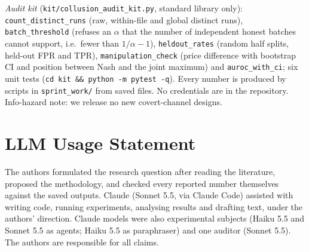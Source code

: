 \documentclass[10pt]{article}
\begin{document}
\emph{Audit kit} (\texttt{kit/collusion\_audit\_kit.py}, standard library only): \texttt{count\_distinct\_runs} (raw, within-file and global distinct runs), \texttt{batch\_threshold} (refuses an $\alpha$ that the number of independent honest batches cannot support, i.e.\ fewer than $1/\alpha-1$), \texttt{heldout\_rates} (random half splits, held-out FPR and TPR), \texttt{manipulation\_check} (price difference with bootstrap CI and position between Nash and the joint maximum) and \texttt{auroc\_with\_ci}; six unit tests (\texttt{cd kit \&\& python -m pytest -q}). Every number is produced by scripts in \texttt{sprint\_work/} from saved files. No credentials are in the repository. Info-hazard note: we release no new covert-channel designs.

\section*{LLM Usage Statement}
The authors formulated the research question after reading the literature, proposed the methodology, and checked every reported number themselves against the saved outputs. Claude (Sonnet 5.5, via Claude Code) assisted with writing code, running experiments, analysing results and drafting text, under the authors' direction. Claude models were also experimental subjects (Haiku 5.5 and Sonnet 5.5 as agents; Haiku 5.5 as paraphraser) and one auditor (Sonnet 5.5). The authors are responsible for all claims.
\end{document}
